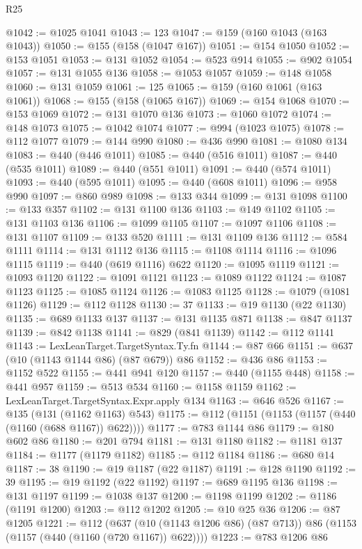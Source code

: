 \begin{lexlean}{R25}
\begin{coremodule}
{{{{{{{{{{{{{{{{{{{{{{{{{{{{{{{{{{{{{{{{{{{{{{{{{{{{{{{{{{{{{{{{{{{{{{{{{{{{{{{{{{{{{{{{{{{{{{{{{{{{{{{{{{{{{{{{{{{{{{{{{{{{{{{{{{{{{{{{{{{{{{{{{{{{{{{{{{{{{{{{{{{{{{{{{{{{{{{{{{{{{{{{{{{{{{{{{{{{{{{@1042 := @1025 @1041
@1043 := 123
@1047 := @159 (@160 @1043 (@163 @1043))
@1050 := @155 (@158 (@1047 @167))
@1051 := @154 @1050
@1052 := @153 @1051
@1053 := @131 @1052
@1054 := @523 @914
@1055 := @902 @1054
@1057 := @131 @1055 @136
@1058 := @1053 @1057
@1059 := @148 @1058
@1060 := @131 @1059
@1061 := 125
@1065 := @159 (@160 @1061 (@163 @1061))
@1068 := @155 (@158 (@1065 @167))
@1069 := @154 @1068
@1070 := @153 @1069
@1072 := @131 @1070 @136
@1073 := @1060 @1072
@1074 := @148 @1073
@1075 := @1042 @1074
@1077 := @994 (@1023 @1075)
@1078 := @112 @1077
@1079 := @144 @990
@1080 := @436 @990
@1081 := @1080 @134
@1083 := @440 (@446 @1011)
@1085 := @440 (@516 @1011)
@1087 := @440 (@535 @1011)
@1089 := @440 (@551 @1011)
@1091 := @440 (@574 @1011)
@1093 := @440 (@595 @1011)
@1095 := @440 (@608 @1011)
@1096 := @958 @990
@1097 := @860 @989
@1098 := @133 @344
@1099 := @131 @1098
@1100 := @133 @357
@1102 := @131 @1100 @136
@1103 := @149 @1102
@1105 := @131 @1103 @136
@1106 := @1099 @1105
@1107 := @1097 @1106
@1108 := @131 @1107
@1109 := @133 @520
@1111 := @131 @1109 @136
@1112 := @584 @1111
@1114 := @131 @1112 @136
@1115 := @1108 @1114
@1116 := @1096 @1115
@1119 := @440 (@619 @1116) @622
@1120 := @1095 @1119
@1121 := @1093 @1120
@1122 := @1091 @1121
@1123 := @1089 @1122
@1124 := @1087 @1123
@1125 := @1085 @1124
@1126 := @1083 @1125
@1128 := @1079 (@1081 @1126)
@1129 := @112 @1128
@1130 := 37
@1133 := @19 @1130 (@22 @1130)
@1135 := @689 @1133 @137
@1137 := @131 @1135 @871
@1138 := @847 @1137
@1139 := @842 @1138
@1141 := @829 (@841 @1139)
@1142 := @112 @1141
@1143 := LexLeanTarget.TargetSyntax.Ty.fn
@1144 := @87 @66
@1151 := @637 (@10 (@1143 @1144 @86) (@87 @679)) @86
@1152 := @436 @86
@1153 := @1152 @522
@1155 := @441 @941 @120
@1157 := @440 (@1155 @448)
@1158 := @441 @957
@1159 := @513 @534
@1160 := @1158 @1159
@1162 := LexLeanTarget.TargetSyntax.Expr.apply @134
@1163 := @646 @526
@1167 := @135 (@131 (@1162 @1163) @543)
@1175 := @112 (@1151 (@1153 (@1157 (@440 (@1160 (@688 @1167)) @622))))
@1177 := @783 @1144 @86
@1179 := @180 @602 @86
@1180 := @201 @794
@1181 := @131 @1180
@1182 := @1181 @137
@1184 := @1177 (@1179 @1182)
@1185 := @112 @1184
@1186 := @680 @14
@1187 := 38
@1190 := @19 @1187 (@22 @1187)
@1191 := @128 @1190
@1192 := 39
@1195 := @19 @1192 (@22 @1192)
@1197 := @689 @1195 @136
@1198 := @131 @1197
@1199 := @1038 @137
@1200 := @1198 @1199
@1202 := @1186 (@1191 @1200)
@1203 := @112 @1202
@1205 := @10 @25 @36
@1206 := @87 @1205
@1221 := @112
    (@637 (@10 (@1143 @1206 @86) (@87 @713)) @86 (@1153 (@1157 (@440 (@1160 (@720 @1167)) @622))))
@1223 := @783 @1206 @86
}}}}}}}}}}}}}}}}}}}}}}}}}}}}}}}}}}}}}}}}}}}}}}}}}}}}}}}}}}}}}}}}}}}}}}}}}}}}}}}}}}}}}}}}}}}}}}}}}}}}}}}}}}}}}}}}}}}}}}}}}}}}}}}}}}}}}}}}}}}}}}}}}}}}}}}}}}}}}}}}}}}}}}}}}}}}}}}}}}}}}}}}}}}}}}}}}}}}}}}
\end{coremodule}
\end{lexlean}
